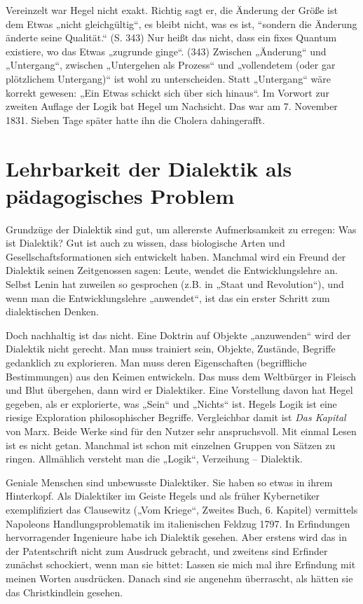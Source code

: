 \documentclass[11pt,a4paper]{article}
\begin{document}
Vereinzelt war Hegel nicht exakt. Richtig sagt er, die Änderung der Größe ist
dem Etwas „nicht gleichgültig“, es bleibt nicht, was es ist, “sondern die
Änderung änderte seine Qualität.“ (S. 343) Nur heißt das nicht, dass ein fixes
Quantum existiere, wo das Etwas „zugrunde ginge“. (343) Zwischen „Änderung“
und „Untergang“, zwischen „Untergehen als Prozess“ und „vollendetem (oder gar
plötzlichem Untergang)“ ist wohl zu unterscheiden. Statt „Untergang“ wäre
korrekt gewesen: „Ein Etwas schickt sich über sich hinaus“. Im Vorwort zur
zweiten Auflage der Logik bat Hegel um Nachsicht. Das war am 7. November 1831.
Sieben Tage später hatte ihn die Cholera dahingerafft.

\section{Lehrbarkeit der Dialektik als pädagogisches Problem}

Grundzüge der Dialektik sind gut, um allererste Aufmerksamkeit zu erregen: Was
ist Dialektik? Gut ist auch zu wissen, dass biologische Arten und
Gesellschaftsformationen sich entwickelt haben. Manchmal wird ein Freund der
Dialektik seinen Zeitgenossen sagen: Leute, wendet die Entwicklungslehre an.
Selbst Lenin hat zuweilen so gesprochen (z.B. in „Staat und Revolution“), und
wenn man die Entwicklungslehre „anwendet“, ist das ein erster Schritt zum
dialektischen Denken.

Doch nachhaltig ist das nicht. Eine Doktrin auf Objekte „anzuwenden“ wird der
Dialektik nicht gerecht. Man muss trainiert sein, Objekte, Zustände, Begriffe
gedanklich zu explorieren. Man muss deren Eigenschaften (begriffliche
Bestimmungen) aus den Keimen entwickeln. Das muss dem Weltbürger in Fleisch
und Blut übergehen, dann wird er Dialektiker. Eine Vorstellung davon hat Hegel
gegeben, als er explorierte, was „Sein“ und „Nichts“ ist. Hegels Logik ist
eine riesige Exploration philosophischer Begriffe. Vergleichbar damit ist
\emph{Das Kapital} von Marx. Beide Werke sind für den Nutzer sehr
anspruchsvoll. Mit einmal Lesen ist es nicht getan. Manchmal ist schon mit
einzelnen Gruppen von Sätzen zu ringen. Allmählich versteht man die „Logik“,
Verzeihung – Dialektik.

Geniale Menschen sind unbewusste Dialektiker. Sie haben so etwas in ihrem
Hinterkopf. Als Dialektiker im Geiste Hegels und als früher Kybernetiker
exemplifiziert das Clausewitz („Vom Kriege“, Zweites Buch, 6. Kapitel)
vermittels Napoleons Handlungsproblematik im italienischen Feldzug 1797. In
Erfindungen hervorragender Ingenieure habe ich Dialektik gesehen. Aber erstens
wird das in der Patentschrift nicht zum Ausdruck gebracht, und zweitens sind
Erfinder zunächst schockiert, wenn man sie bittet: Lassen sie mich mal ihre
Erfindung mit meinen Worten ausdrücken. Danach sind sie angenehm überrascht,
als hätten sie das Christkindlein gesehen.
\end{document}
